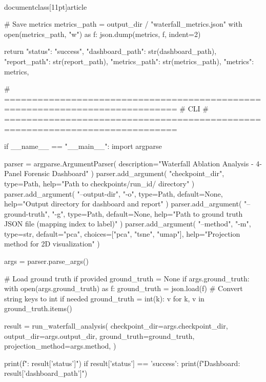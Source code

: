 \\documentclass[11pt]{article}
\begin{document}
\begin{CodeBlock}
    # Save metrics
    metrics_path = output_dir / "waterfall_metrics.json"
    with open(metrics_path, "w") as f:
        json.dump(metrics, f, indent=2)

    return {
        "status": "success",
        "dashboard_path": str(dashboard_path),
        "report_path": str(report_path),
        "metrics_path": str(metrics_path),
        "metrics": metrics,
    }


# =============================================================================
# CLI
# =============================================================================

if __name__ == "__main__":
    import argparse

    parser = argparse.ArgumentParser(
        description="Waterfall Ablation Analysis - 4-Panel Forensic Dashboard"
    )
    parser.add_argument(
        "checkpoint_dir",
        type=Path,
        help="Path to checkpoints/{run_id}/ directory"
    )
    parser.add_argument(
        "--output-dir", "-o",
        type=Path,
        default=None,
        help="Output directory for dashboard and report"
    )
    parser.add_argument(
        "--ground-truth", "-g",
        type=Path,
        default=None,
        help="Path to ground truth JSON file (mapping index to label)"
    )
    parser.add_argument(
        "--method", "-m",
        type=str,
        default="pca",
        choices=["pca", "tsne", "umap"],
        help="Projection method for 2D visualization"
    )

    args = parser.parse_args()

    # Load ground truth if provided
    ground_truth = None
    if args.ground_truth:
        with open(args.ground_truth) as f:
            ground_truth = json.load(f)
            # Convert string keys to int if needed
            ground_truth = {int(k): v for k, v in ground_truth.items()}

    result = run_waterfall_analysis(
        checkpoint_dir=args.checkpoint_dir,
        output_dir=args.output_dir,
        ground_truth=ground_truth,
        projection_method=args.method,
    )

    print(f"\nResult: {result['status']}")
    if result['status'] == 'success':
        print(f"Dashboard: {result['dashboard_path']}")

\end{CodeBlock}
\end{document}
